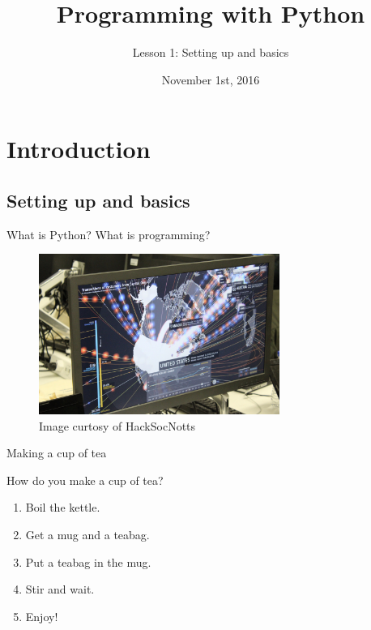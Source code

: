 \documentclass{beamer}
\title{Programming with Python}
\subtitle{Lesson 1: Setting up and basics}
\date{November 1st, 2016}
\begin{document}
\begin{frame}
  \titlepage
\end{frame}


\section{Introduction}

\subsection{Setting up and basics}

\begin{frame}{What is Python? What is programming?}
\begin{figure}[h]
\includegraphics[width=0.7\textwidth]{wow}
\caption{Image curtosy of HackSocNotts}
\end{figure}
\end{frame}

\begin{frame}{Making a cup of tea}

How do you make a cup of tea?
\pause
\begin{enumerate}

  \item {
    Boil the kettle.
    \pause %
  }
  \item {   
    Get a mug and a teabag.
    \pause
  }
  \item {
    Put a teabag in the mug.
    \pause
  }
  \item {
    Stir and wait.
    \pause
  }
  \item {
    Enjoy!
  }
  \end{enumerate}

\end{frame}
\end{document}

